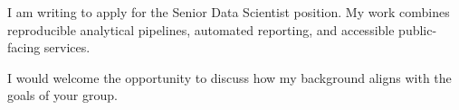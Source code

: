 \documentclass[fontsize=10pt, margin=narrow]{careerdossier-letter}
\begin{document}
\MakeCDossierLetterhead

I am writing to apply for the Senior Data Scientist position. My work combines
reproducible analytical pipelines, automated reporting, and accessible
public-facing services.

I would welcome the opportunity to discuss how my background aligns with the
goals of your group.

\MakeCDossierClosing
\end{document}
